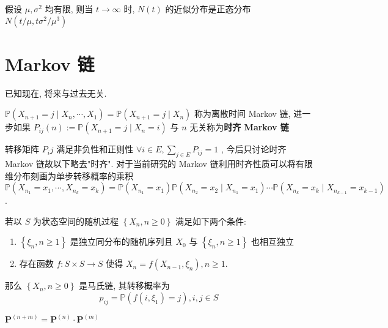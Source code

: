 \documentclass[10pt]{yerbaformat}
\begin{document}
\begin{theorem}[更新过程的中心极限定理]
    假设 $\mu, \sigma^{2}$ 均有限, 则当 $t \rightarrow \infty$ 时, $N(t)$ 的近似分布是正态分布 $ N\left(t / \mu, t \sigma^{2} / \mu^{3}\right) $
\end{theorem}

\section{Markov 链}

\begin{definition}[无后效性]
    已知现在, 将来与过去无关.
\end{definition}

\begin{definition}
    $\mathbb{P}\left(X_{n+1}=j \mid X_{n}, \cdots, X_{1}\right)=\mathbb{P}\left(X_{n+1}=j \mid X_{n}\right)$ 称为离散时间 Markov 链, 进一步如果 $P_{i j}(n):=\mathbb{P}\left(X_{n+1}=j \mid X_{n}=i\right)$ 与 $n$ 无关称为\textbf{时齐 Markov 链}
\end{definition}

\par 转移矩阵 $P_ij$ 满足非负性和正则性 $\forall i \in E, \sum_{j \in E} P_{i j}=1$ , 今后只讨论时齐 Markov 链故以下略去"时齐". 对于当前研究的 Markov 链利用时齐性质可以将有限维分布刻画为单步转移概率的乘积 $$\mathbb{P}\left(X_{n_{1}}=x_{1}, \cdots, X_{n_{k}}=x_{k}\right)=\mathbb{P}\left(X_{n_{1}}=x_{1}\right) \mathbb{P}\left(X_{n_{2}}=x_{2} \mid X_{n_{1}}=x_{1}\right) \cdots \mathbb{P}\left(X_{n_{k}}=x_{k} \mid X_{n_{k-1}}=x_{k-1}\right)$$.

\begin{theorem}
    若以 $S$ 为状态空间的随机过程 $\left\{X_{n}, n \geq 0\right\}$ 满足如下两个条件:
    \begin{enumerate}
        \item $\left\{\xi_{n}, n \geq 1\right\}$ 是独立同分布的随机序列且 $X_{0}$ 与 $\left\{\xi_{n}, n \geq 1\right\}$ 也相互独立
        \item 存在函数 $f: S \times S \rightarrow S$ 使得 $X_{n}=f\left(X_{n-1}, \xi_{n}\right), n \geq 1 .$
    \end{enumerate}
    那么 $\left\{X_{n}, n \geq 0\right\}$ 是马氏链, 其转移概率为
    $$p_{i j}=\mathbb{P}\left(f\left(i, \xi_{1}\right)=j\right), i, j \in S$$
\end{theorem}

\begin{theorem}
    $\mathbf{P}^{(n+m)}=\mathbf{P}^{(n)} \cdot \mathbf{P}^{(m)}$
\end{theorem}
\end{document}
